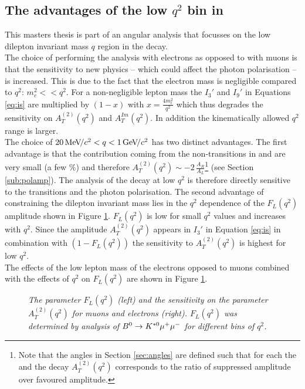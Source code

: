 \subsection{The advantages of the low $q^2$ bin in \BdKstee}
This masters thesis is part of an angular analysis that focusses on the low dilepton invariant mass $q$ region in the \BdKstee decay.\\
The choice of performing the analysis with electrons as opposed to with muons is that the sensitivity to new physics -- which could affect the photon polarisation -- is increased. This is due to the fact that the electron mass is negligible compared to $q^2$: $m^2_e<< q^2$. For a non-negligible lepton mass the $I_3'$ and $I_9'$ in Equations \ref{eq:is} are multiplied by $(1-x)$ with $ x = \frac{4m^2_{l}}{q^2}$ which thus degrades the sensitivity on $A^{(2)}_T(q^2)$ and $A^{Im}_T(q^2)$. In addition the kinematically allowed $q^2$ range is larger.\\
The choice of $20 {\mathrm{\,Me\kern -0.1em V\!/}c^2} < q < 1{\mathrm{\,Ge\kern -0.1em V\!/}c^2} $ has two distinct advantages. The first advantage is that the contribution coming from the non-\bsll transitions in  and  are very small (a few \%) and therefore $A^{(2)}_T(q^2) \sim -2\, \frac{A_R}{A_L}$\footnote{Note that the angles in Section \ref{sec:angles} are defined such that for each the \bsll and the \bbsll decay $A^{(2)}_T(q^2)$ corresponds to the ratio of suppressed amplitude over favoured amplitude.} (see Section \ref{sub:polamp}). The analysis of the \BdKstee decay at low $q^2$ is therefore directly sensitive to the \bsll transitions and the photon polarisation. The second advantage of constraining the dilepton invariant mass lies in the $q^2$ dependence of the $F_L(q^2)$ amplitude shown in Figure \ref{fig:sens}. $F_L(q^2)$ is low for small $q^2$ values and increases with $q^2$. Since the amplitude $A^{(2)}_T(q^2)$ appears in $I_3'$ in Equation \ref{eq:is} in combination with $(1-F_L(q^2))$ the sensitivity to $A^{(2)}_T(q^2)$ is highest for low $q^2$. \\
The effects of the low lepton mass of the electrons opposed to muons combined with the effects of $q^2$ on $F_L(q^2)$ are shown in Figure \ref{fig:sens}.\\
\begin{figure}[ht]
\vspace*{-0.5cm}
  \begin{center}
  \vspace*{-0.5cm}
  \end{center}
  \caption{\textit{The parameter $F_L(q^2)$ (left) and the sensitivity on the parameter $A^{(2)}_T(q^2)$ for muons and electrons (right). $F_L(q^2)$ was determined by analysis of $B^0 \rightarrow K^{*0} \mu^+ \mu^-$ for different bins of $q^2$.}\cite{mumu}}
  \label{fig:sens}
\end{figure}

